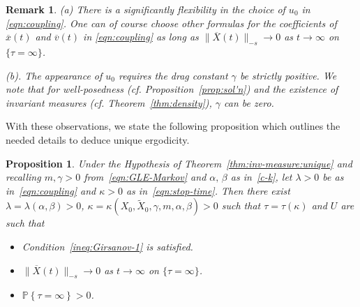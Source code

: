 \documentclass[11pt]{amsart}
\theoremstyle{definition}
\newcommand{\Xtil}{\widetilde{X}}
\newcommand{\Xbar}{\overline{X}}
\newcommand{\xbar}{\overline{x}}
\newcommand{\vbar}{\overline{v}}
\renewcommand{\P}[1]{\mathbb{P}\left\{#1\right\}}
\theoremstyle{definition}
\theoremstyle{plain}
\newtheorem{proposition}[theorem]{Proposition}
\newtheorem{remark}[theorem]{Remark}
\numberwithin{equation}{section}
\begin{document}
\begin{remark} (a) There is a significantly flexibility in the choice of $u_0$ in \eqref{eqn:coupling}. One can of course choose other formulas for the coefficients of $\xbar(t)$ and $\vbar(t)$ in \eqref{eqn:coupling} as long as $\| \Xbar(t)\|_{-s}\rightarrow 0$ as $t\rightarrow \infty$ on $ \{ \tau= \infty\}$. 

(b). The appearance of $u_0$ requires the drag constant $\gamma$ be strictly positive. We note that for well-posedness (cf. Proposition~\ref{prop:sol'n}) and the existence of invariant measures (cf. Theorem~\ref{thm:density}), $\gamma$ can be zero. 


\end{remark}

With these observations, we state the following proposition which outlines the needed details to deduce unique ergodicity.  
\begin{proposition}\label{prop:asymp-coupling} Under the Hypothesis of Theorem~\ref{thm:inv-measure:unique} and recalling $m,\gamma>0$ from~\eqref{eqn:GLE-Markov} and $\alpha,\,\beta$ as in~\eqref{c-k}, let $\lambda>0$ be as in~\eqref{eqn:coupling} and $\kappa>0$ as in~\eqref{eqn:stop-time}. Then there exist $\lambda=\lambda(\alpha,\beta)>0$, $\kappa=\kappa(X_0,\Xtil_0,\gamma,m,\alpha,\beta)>0$ such that $\tau=\tau(\kappa)$ and $U$ are such that 
\begin{itemize}
\item[(a)]  Condition~\eqref{ineq:Girsanov-1} is satisfied. 
\item[(b)] $\|\Xbar(t)\|_{-s}\rightarrow 0$ as $t\rightarrow\infty$ on $\{\tau=\infty\}$. 
\item[(c)] $\P{\tau=\infty}>0$.
\end{itemize} 
\end{proposition}
\end{document}
